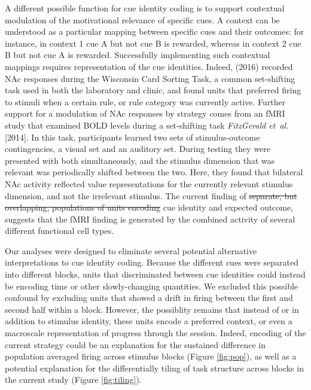 \documentclass[11pt]{article}
\newcommand{\ldiffentity}[1]{#1}
\providecommand{\DIFadd}[1]{{\protect\color{blue}\uwave{#1}}} %
\providecommand{\DIFdel}[1]{{\protect\color{red}\sout{#1}}}                      %
\providecommand{\DIFaddbegin}{} %
\providecommand{\DIFaddend}{} %
\providecommand{\DIFdelbegin}{} %
\providecommand{\DIFdelend}{} %
\newcommand{\DIFscaledelfig}{0.5}
\newlength{\DIFdelgraphicswidth} %
\newlength{\DIFdelgraphicsheight} %
\newcommand{\DIFaddincludegraphics}[2][]{{\color{blue}\fbox{\DIFOincludegraphics[#1]{#2}}}} %
\newcommand{\DIFdelincludegraphics}[2][]{%
\sbox{\DIFdelgraphicsbox}{\DIFOincludegraphics[#1]{#2}}%
\settoboxwidth{\DIFdelgraphicswidth}{\DIFdelgraphicsbox} %
\settoboxtotalheight{\DIFdelgraphicsheight}{\DIFdelgraphicsbox} %
\scalebox{\DIFscaledelfig}{%
\parbox[b]{\DIFdelgraphicswidth}{\usebox{\DIFdelgraphicsbox}\\[-\baselineskip] \rule{\DIFdelgraphicswidth}{0em}}\llap{\resizebox{\DIFdelgraphicswidth}{\DIFdelgraphicsheight}{%
\setlength{\unitlength}{\DIFdelgraphicswidth}%
\begin{picture}(1,1)%
\thicklines\linethickness{2pt} %
{\color[rgb]{1,0,0}\put(0,0){\framebox(1,1){}}}%
{\color[rgb]{1,0,0}\put(0,0){\line( 1,1){1}}}%
{\color[rgb]{1,0,0}\put(0,1){\line(1,-1){1}}}%
\end{picture}%
}\hspace*{3pt}}} %
} %
\DeclareRobustCommand{\DIFaddbegin}{\DIFOaddbegin \let\includegraphics\DIFaddincludegraphics} %
\DeclareRobustCommand{\DIFaddend}{\DIFOaddend \let\includegraphics\DIFOincludegraphics} %
\DeclareRobustCommand{\DIFdelbegin}{\DIFOdelbegin \let\includegraphics\DIFdelincludegraphics} %
\DeclareRobustCommand{\DIFdelend}{\DIFOaddend \let\includegraphics\DIFOincludegraphics} %
\begin{document}
\DIFaddend A different possible function for cue identity coding is to support
contextual modulation of the motivational relevance of specific
cues. A context can be understood as a particular mapping between
specific cues and their outcomes: for instance, in context 1 cue A but
not cue B is rewarded, whereas in context 2 cue B but not cue A is
rewarded. Successfully implementing such contextual mappings requires
representation of the cue identities. Indeed, \citeauthor{Sleezer2016} (2016)
recorded NAc responses during the Wisconsin Card Sorting Task,
a common set-shifting task used in both the laboratory and clinic, and
found units that preferred firing to stimuli when a certain rule, or
rule category was currently active. Further support for a
modulation of NAc responses by strategy comes from an fMRI study that
examined BOLD levels during a set-shifting task
\ldiffentity{\textit{FitzGerald et~al.} [\ldiffentity{2014}]}. In this task, participants learned two sets of
stimulus-outcome contingencies, a visual set and an auditory set. During
testing they were presented with both simultaneously, and the stimulus
dimension that was relevant was periodically shifted between the
two. Here, they found that bilateral NAc activity reflected value
representations for the currently relevant stimulus dimension, and not
the irrelevant stimulus. The current finding of \DIFdelbegin \DIFdel{separate, but
overlapping, populations of units encoding }\DIFdelend \DIFaddbegin \DIFadd{independent coding of }\DIFaddend cue identity and expected
outcome, suggests that the fMRI finding is generated by the combined
activity of several different functional cell types.

Our analyses were designed to eliminate several potential alternative
interpretations to cue identity coding. Because the different cues
were separated into different blocks, units that discriminated between
cue identities could instead be encoding time or other slowly-changing
quantities. We excluded this possible confound by excluding units that
showed a drift in firing between the first and second half within a
block. However, the possiblity remains that instead of or in addition
to stimulus identity, these units encode a preferred context, or even
a macroscale representation of progress through the session. Indeed,
encoding of the current strategy could be an explanation for the
sustained difference in population averaged firing across stimulus
blocks (Figure \ref{fig:pop}), as well as a potential explanation for
the differentially tiling of task structure across blocks in the
current study (Figure \ref{fig:tiling}).
\end{document}
